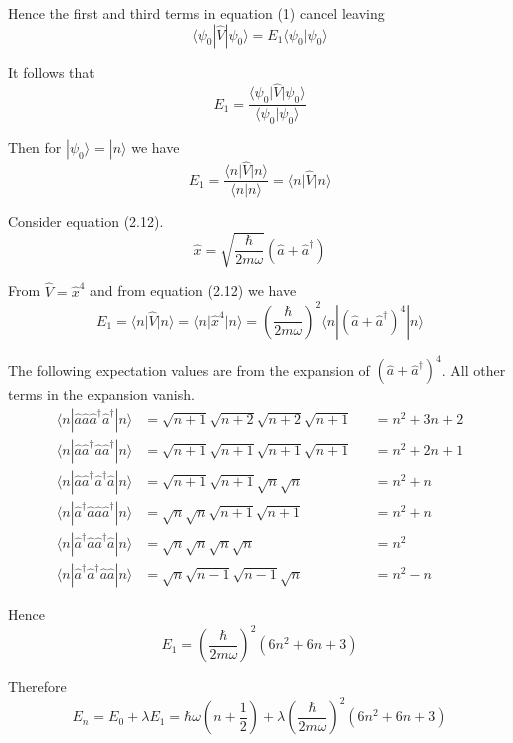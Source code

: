 \documentclass[12pt]{article}
\begin{document}
Hence the first and third terms in equation (1) cancel leaving
\begin{equation*}
\langle\psi_0|\hat V|\psi_0\rangle
=E_1\langle\psi_0|\psi_0\rangle
\end{equation*}

It follows that
\begin{equation*}
E_1=\frac{\langle\psi_0\vert\hat V\vert\psi_0\rangle}{\langle\psi_0\vert\psi_0\rangle}
\end{equation*}

Then for $|\psi_0\rangle=|n\rangle$ we have
\begin{equation*}
E_1=\frac{\langle n\vert\hat V\vert n\rangle}{\langle n\vert n\rangle}
=\langle n\vert\hat V\vert n\rangle
\end{equation*}

Consider equation (2.12).
\begin{equation*}
\hat x=\sqrt{\frac{\hbar}{2m\omega}}\left(\hat a+\hat a^\dag\right)
\tag{2.12}
\end{equation*}

From $\hat V=\hat x^4$ and from equation (2.12) we have
\begin{equation*}
E_1=\langle n\vert\hat V\vert n\rangle
=\langle n\vert\hat x^4\vert n\rangle
=\left(\frac{\hbar}{2m\omega}\right)^2
\langle n|\left(\hat a+\hat a^\dag\right)^4|n\rangle
\end{equation*}

The following expectation values are from the expansion of $(\hat a+\hat a^\dag)^4$.
All other terms in the expansion vanish.
\begin{align*}
\langle n|\hat a\hat a\hat a^\dag\hat a^\dag|n\rangle
&=\sqrt{n+1}\sqrt{n+2}\sqrt{n+2}\sqrt{n+1}
& {}&=n^2+3n+2
\\
\langle n|\hat a\hat a^\dag\hat a\hat a^\dag|n\rangle
&=\sqrt{n+1}\sqrt{n+1}\sqrt{n+1}\sqrt{n+1}
& {}&=n^2+2n+1
\\
\langle n|\hat a\hat a^\dag\hat a^\dag\hat a|n\rangle
&=\sqrt{n + 1}\sqrt{n + 1}\sqrt{n}\sqrt{n}
& {}&=n^2+n
\\
\langle n|\hat a^\dag\hat a\hat a\hat a^\dag|n\rangle
&=\sqrt{n}\sqrt{n}\sqrt{n+1}\sqrt{n+1}
& {}&=n^2+n
\\
\langle n|\hat a^\dag\hat a\hat a^\dag\hat a|n\rangle
&=\sqrt{n}\sqrt{n}\sqrt{n}\sqrt{n}
& {}&=n^2
\\
\langle n|\hat a^\dag\hat a^\dag\hat a\hat a|n\rangle
&=\sqrt{n}\sqrt{n-1}\sqrt{n-1}\sqrt{n}
& {}&=n^2-n
\end{align*}

Hence
\begin{equation*}
E_1=\left(\frac{\hbar}{2m\omega}\right)^2\left(6n^2+6n+3\right)
\end{equation*}

Therefore
\begin{equation*}
E_n=E_0+\lambda E_1=\hbar\omega\left(n+\frac{1}{2}\right)
+\lambda\left(\frac{\hbar}{2m\omega}\right)^2\left(6n^2+6n+3\right)
\end{equation*}
\end{document}
